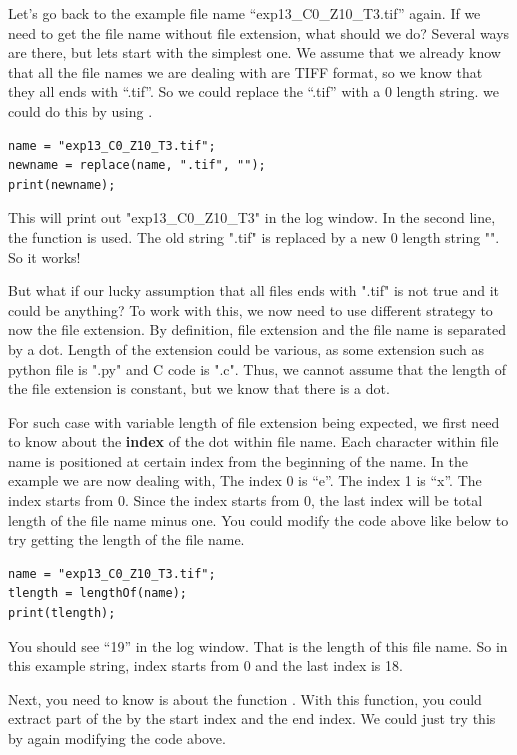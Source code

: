 Let's go back to the example file name ``exp13\_C0\_Z10\_T3.tif'' again. If we need to get the file name without file extension, what should we do? Several ways are there, but lets start with the simplest one. We assume that we already know that all the file names we are dealing with are TIFF format, so we know that they all ends with ``.tif''. So we could replace the ``.tif'' with a 0 length string. we could do this by using . 

\begin{lstlisting}
name = "exp13_C0_Z10_T3.tif";
newname = replace(name, ".tif", "");
print(newname);
\end{lstlisting}

This will print out "exp13\_C0\_Z10\_T3" in the log window. In the second line, the function  is used. The old string ".tif" is replaced by a new 0 length string "". So it works! 

But what if our lucky assumption that all files ends with ".tif" is not true and it could be anything? To work with this, we now need to use different strategy to now the file extension. By definition, file extension and the file name is separated by a dot. Length of the extension could be various, as some extension such as python file is ".py" and C code is ".c". Thus, we cannot assume that the length of the file extension is constant, but we know that there is a dot. 

For such case with variable length of file extension being expected, we first need to know about the \textbf{index} of the dot within file name. Each character within file name is positioned at certain index from the beginning of the name. In the example we are now dealing with, The index 0 is ``e''. The index 1 is ``x''. The index starts from 0. Since the index starts from 0, the last index will be total length of the file name minus one. You could modify the code above like below to try getting the length of the file name. 

\begin{lstlisting}
name = "exp13_C0_Z10_T3.tif";
tlength = lengthOf(name);
print(tlength);
\end{lstlisting}

You should see ``19'' in the log window. That is the length of this file name. So in this example string, index starts from 0 and the last index is 18. 

Next, you need to know is about the function . With this function, you could extract part of the  by the start index and the end index. We could just try this by again modifying the code above. 

